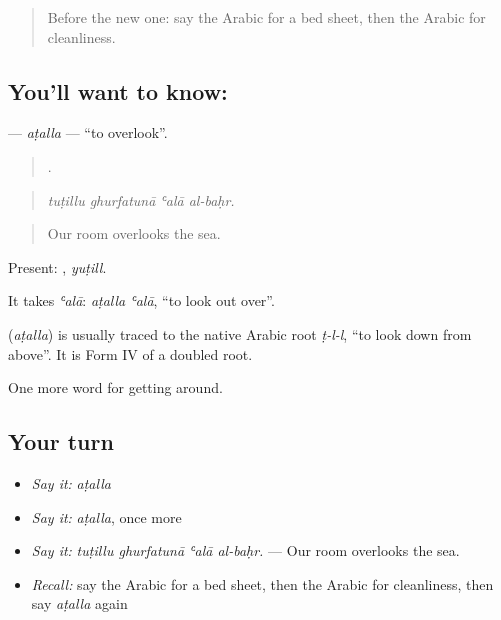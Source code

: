 \begin{quote}
Before the new one: say the Arabic for a bed sheet, then the Arabic for cleanliness.
\end{quote}

\subsection*{You'll want to know: }
\textbf{} — \emph{aṭalla} — \textquotedblleft{}to overlook\textquotedblright{}.

\begin{quote}
   .
\end{quote}

\begin{quote}
\emph{tuṭillu ghurfatunā ʿalā al-baḥr.}
\end{quote}

\begin{quote}
Our room overlooks the sea.
\end{quote}

Present: , \emph{yuṭill}.

It takes \emph{ʿalā}: \emph{aṭalla ʿalā}, \textquotedblleft{}to look out over\textquotedblright{}.

\begin{cousinweb}
\textbf{} (\emph{aṭalla}) is usually traced to the native Arabic root \emph{ṭ-l-l}, \textquotedblleft{}to look down from above\textquotedblright{}. It is Form IV of a doubled root.
\end{cousinweb}

\begin{grammarlens}[title={What you've built}]
One more word for getting around.
\end{grammarlens}

\subsection*{Your turn}
\begin{itemize}
\raggedright
  \item \emph{Say it:} \emph{aṭalla}
  \item \emph{Say it:} \emph{aṭalla}, once more
  \item \emph{Say it:} \emph{tuṭillu ghurfatunā ʿalā al-baḥr.} — Our room overlooks the sea.
  \item \emph{Recall:} say the Arabic for a bed sheet, then the Arabic for cleanliness, then say \emph{aṭalla} again
\end{itemize}

